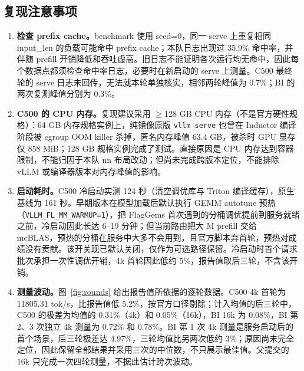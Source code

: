 \documentclass[11pt,a4paper]{ctexart}
\begin{document}
\subsection{复现注意事项}\label{sec:repro-notes}
\begin{enumerate}[label=（\arabic*）,leftmargin=3em]
\item \textbf{检查 prefix cache。}benchmark 使用 seed=0，同一 serve 上重复相同 input\_len 的负载可能命中 prefix cache；本队日志出现过 35.9\% 命中率，并伴随 prefill 开销降低和吞吐虚高。旧日志不能证明各次运行均无命中，因此每个数据点都须检查命中率日志，必要时在新启动的 serve 上测量。C500 最终轮的 serve 日志未回传，无法就本轮单独核实，相邻两轮峰值为 0.7\%；BI 的两次复测峰值分别为 0.3\%。

\item \textbf{C500 的 CPU 内存。}复现建议采用 $\geq$128 GB CPU 内存（不是官方硬性规格）：64 GB 内存规格实例上，纯镜像原版 \texttt{vllm serve} 也曾在 Inductor 编译阶段被 cgroup OOM killer 杀掉，匿名内存峰值 63.4 GB，被杀时 GPU 显存仅 858 MiB；128 GB 规格实例完成了测试。直接原因是 CPU 内存达到容器限制，不能归因于本队 nn 布局改动；但尚未完成跨版本定位，不能排除 vLLM 或编译器版本对内存峰值的影响。

\item \textbf{启动耗时。}C500 冷启动实测 124 秒（清空调优库与 Triton 编译缓存），原生基线为 161 秒。早期版本在模型加载后默认执行 GEMM autotune 预热（\texttt{VLLM\_FL\_MM\_WARMUP=1}），把 FlagGems 首次遇到的分桶调优提前到服务就绪之前，冷启动因此长达 6--19 分钟；但当前路由把大 M prefill 交给 mcBLAS，预热的分桶在服务中大多不会用到，且官方脚本弃首轮，预热对成绩没有贡献。该开关现已默认关闭，仅作为可选路径保留。冷启动时首个请求批次承担一次性调优开销，4k 首轮因此低约 5\%，报告值取后三轮，不含该开销。

\item \textbf{测量波动。}图~\ref{fig:rounds} 给出报告值所依据的逐轮数据。C500 4k 首轮为 11805.31 tok/s，比报告值低 5.2\%，按官方口径剔除；计入均值的后三轮中，C500 的极差为均值的 0.31\%（4k）和 0.05\%（16k），BI 16k 为 0.08\%，BI 第 2、3 次独立 4k 测量为 0.72\% 和 0.78\%。BI 第 1 次 4k 测量是服务启动后的首个场景，后三轮极差达 4.97\%，三轮均值比另两次低约 3\%；原因尚未完全定位，因此保留全部结果并采用三次的中位数，不只展示最佳值。父提交的 16k 只完成一次四轮测量，不据此估计跨次波动。


\end{enumerate}
\end{document}
